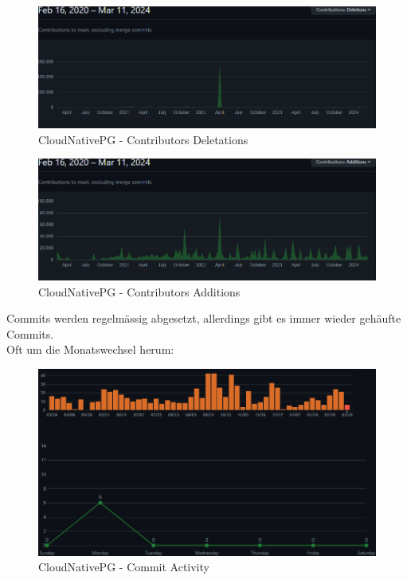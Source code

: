 \begin{flushleft}
\begin{figure}[H]
        \centering
        \includegraphics[width=0.75\linewidth]{source/implementation/evaluation/postgresql_ha_solutions/insights/cloudnativepg/contributors_deletations_cloudnative-pg_cloudnative-pg}
        \caption{CloudNativePG - Contributors Deletations}
        \label{fig:contributors_deletations_cloudnative-pg_cloudnative-pg}
    \end{figure}
    \begin{figure}[H]
        \centering
        \includegraphics[width=0.75\linewidth]{source/implementation/evaluation/postgresql_ha_solutions/insights/cloudnativepg/contributors_additions_cloudnative-pg_cloudnative-pg}
        \caption{CloudNativePG - Contributors Additions}
        \label{fig:contributors_additions_cloudnative-pg_cloudnative-pg}
    \end{figure}
    Commits werden regelmässig abgesetzt, allerdings gibt es immer wieder gehäufte Commits.\\
    Oft um die Monatswechsel herum:
    \begin{figure}[H]
        \centering
        \includegraphics[width=0.75\linewidth]{source/implementation/evaluation/postgresql_ha_solutions/insights/cloudnativepg/commit_activity_cloudnative-pg_cloudnative-pg}
        \caption{CloudNativePG - Commit Activity}
        \label{fig:commit_activity_cloudnative-pg_cloudnative-pg}
    \end{figure}
\end{flushleft}
